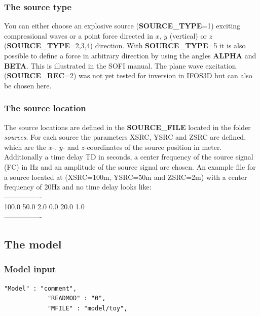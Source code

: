 \subsubsection*{The source type}
You can either choose an explosive source (\textbf{SOURCE\_TYPE}=1) exciting compressional waves or a  point force directed in $x$, $y$ (vertical) or $z$  (\textbf{SOURCE\_TYPE}=2,3,4) direction. With \textbf{SOURCE\_TYPE}=5 it is also possible to define a force in arbitrary direction by using the angles \textbf{ALPHA} and \textbf{BETA}. This is illustrated in the SOFI manual. 
The plane wave excitation (\textbf{SOURCE\_REC}=2) was not yet tested for inversion in IFOS3D but can also be chosen here.
\subsubsection*{The source location}
The source locations are defined in the \textbf{SOURCE\_FILE} located in the folder \textit{sources}. For each source the parameters XSRC, YSRC and ZSRC are defined, which are the $x$-, $y$- and $z$-coordinates of the source position in meter. Additionally a time delay TD in seconds, a center frequency of the source signal (FC) in Hz and an amplitude of the source signal are chosen. An example file for a source located at (XSRC=100m, YSRC=50m and ZSRC=2m) with a center frequency of 20Hz and no time delay looks like:\\
----------------\\
100.0 \hspace{0.2cm} 50.0 \hspace{0.2cm} 2.0 \hspace{0.2cm} 0.0 \hspace{0.2cm} 20.0 \hspace{0.2cm} 1.0\\
----------------
\subsection{The model}
\subsubsection*{Model input}
\begin{verbatim}
"Model" : "comment",
			"READMOD" : "0",
			"MFILE" : "model/toy",
\end{verbatim}

